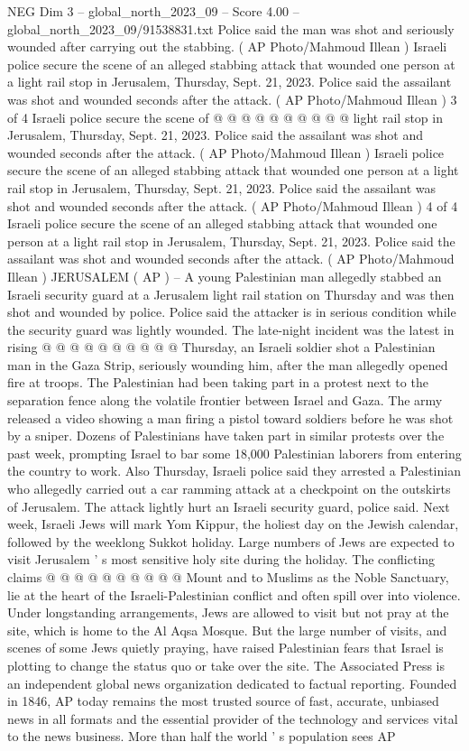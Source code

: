 \begin{textsample}{NEG Dim 3 – global\_north\_2023\_09 – Score 4.00 – global\_north\_2023\_09/91538831.txt}
Police said the man was shot and seriously wounded after carrying out the stabbing. ( AP Photo/Mahmoud Illean ) Israeli police secure the scene of an alleged stabbing attack that wounded one person at a light rail stop in Jerusalem, Thursday, Sept. 21, 2023.
Police said the assailant was shot and wounded seconds after the attack. ( AP Photo/Mahmoud Illean ) 3 of 4 Israeli police secure the scene of @ @ @ @ @ @ @ @ @ @ light rail stop in Jerusalem, Thursday, Sept. 21, 2023.
Police said the assailant was shot and wounded seconds after the attack. ( AP Photo/Mahmoud Illean ) Israeli police secure the scene of an alleged stabbing attack that wounded one person at a light rail stop in Jerusalem, Thursday, Sept. 21, 2023.
Police said the assailant was shot and wounded seconds after the attack. ( AP Photo/Mahmoud Illean ) 4 of 4 Israeli police secure the scene of an alleged stabbing attack that wounded one person at a light rail stop in Jerusalem, Thursday, Sept. 21, 2023.
Police said the assailant was shot and wounded seconds after the attack. ( AP Photo/Mahmoud Illean ) JERUSALEM ( AP ) -- A young Palestinian man allegedly stabbed an Israeli security guard at a Jerusalem light rail station on Thursday and was then shot and wounded by police.
Police said the attacker is in serious condition while the security guard was lightly wounded.
The late-night incident was the latest in rising @ @ @ @ @ @ @ @ @ @ Thursday, an Israeli soldier shot a Palestinian man in the Gaza Strip, seriously wounding him, after the man allegedly opened fire at troops.
The Palestinian had been taking part in a protest next to the separation fence along the volatile frontier between Israel and Gaza.
The army released a video showing a man firing a pistol toward soldiers before he was shot by a sniper.
Dozens of Palestinians have taken part in similar protests over the past week, prompting Israel to bar some 18,000 Palestinian laborers from entering the country to work.
Also Thursday, Israeli police said they arrested a Palestinian who allegedly carried out a car ramming attack at a checkpoint on the outskirts of Jerusalem.
The attack lightly hurt an Israeli security guard, police said.
Next week, Israeli Jews will mark Yom Kippur, the holiest day on the Jewish calendar, followed by the weeklong Sukkot holiday.
Large numbers of Jews are expected to visit Jerusalem ' s most sensitive holy site during the holiday.
The conflicting claims @ @ @ @ @ @ @ @ @ @ Mount and to Muslims as the Noble Sanctuary, lie at the heart of the Israeli-Palestinian conflict and often spill over into violence.
Under longstanding arrangements, Jews are allowed to visit but not pray at the site, which is home to the Al Aqsa Mosque.
But the large number of visits, and scenes of some Jews quietly praying, have raised Palestinian fears that Israel is plotting to change the status quo or take over the site.
The Associated Press is an independent global news organization dedicated to factual reporting.
Founded in 1846, AP today remains the most trusted source of fast, accurate, unbiased news in all formats and the essential provider of the technology and services vital to the news business.
More than half the world ' s population sees AP


\end{textsample}
